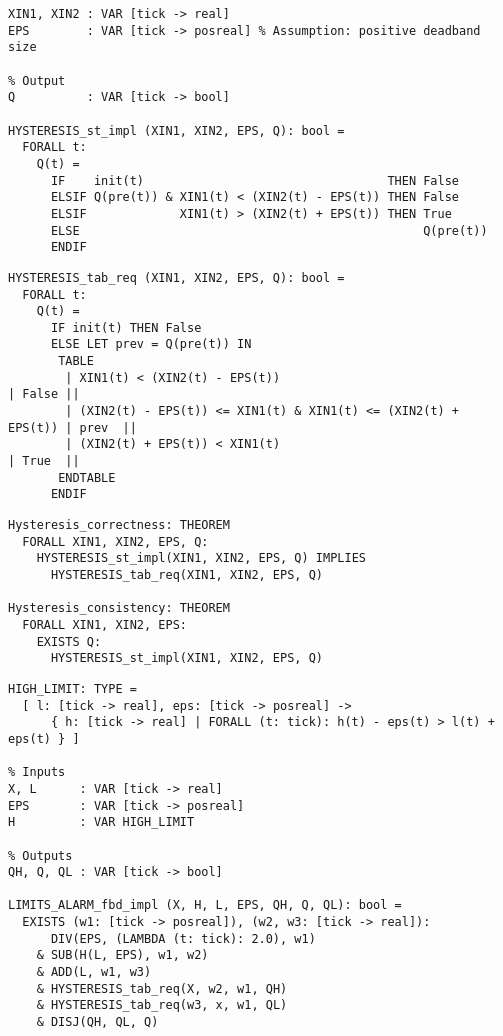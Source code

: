 \documentclass{article}
\begin{document}
\begin{lstlisting}[language=pvs,numbers=none]
% Inputs
XIN1, XIN2 : VAR [tick -> real]
EPS        : VAR [tick -> posreal] % Assumption: positive deadband size

% Output
Q          : VAR [tick -> bool]

HYSTERESIS_st_impl (XIN1, XIN2, EPS, Q): bool =
  FORALL t:
    Q(t) = 
      IF    init(t)                                  THEN False
      ELSIF Q(pre(t)) & XIN1(t) < (XIN2(t) - EPS(t)) THEN False
      ELSIF             XIN1(t) > (XIN2(t) + EPS(t)) THEN True
      ELSE                                                Q(pre(t))
      ENDIF
\end{lstlisting}

\begin{lstlisting}[language=pvs,numbers=none]
HYSTERESIS_tab_req (XIN1, XIN2, EPS, Q): bool =
  FORALL t:
    Q(t) = 
      IF init(t) THEN False
      ELSE LET prev = Q(pre(t)) IN
       TABLE
        | XIN1(t) < (XIN2(t) - EPS(t))                                  | False ||
        | (XIN2(t) - EPS(t)) <= XIN1(t) & XIN1(t) <= (XIN2(t) + EPS(t)) | prev  ||
        | (XIN2(t) + EPS(t)) < XIN1(t)                                  | True  ||
       ENDTABLE
      ENDIF
\end{lstlisting}

\begin{lstlisting}[language=pvs,numbers=none]
Hysteresis_correctness: THEOREM 
  FORALL XIN1, XIN2, EPS, Q:
    HYSTERESIS_st_impl(XIN1, XIN2, EPS, Q) IMPLIES 
      HYSTERESIS_tab_req(XIN1, XIN2, EPS, Q)

Hysteresis_consistency: THEOREM
  FORALL XIN1, XIN2, EPS:
    EXISTS Q:
      HYSTERESIS_st_impl(XIN1, XIN2, EPS, Q)
\end{lstlisting}

\clearpage

\begin{lstlisting}[language=pvs,numbers=none]
% Assumption: low and high alarm hysteresis regions do not overlap
HIGH_LIMIT: TYPE = 
  [ l: [tick -> real], eps: [tick -> posreal] -> 
      { h: [tick -> real] | FORALL (t: tick): h(t) - eps(t) > l(t) + eps(t) } ]

% Inputs
X, L      : VAR [tick -> real]
EPS       : VAR [tick -> posreal]
H         : VAR HIGH_LIMIT

% Outputs
QH, Q, QL : VAR [tick -> bool]

LIMITS_ALARM_fbd_impl (X, H, L, EPS, QH, Q, QL): bool =
  EXISTS (w1: [tick -> posreal]), (w2, w3: [tick -> real]):
      DIV(EPS, (LAMBDA (t: tick): 2.0), w1) 
    & SUB(H(L, EPS), w1, w2) 
    & ADD(L, w1, w3) 
    & HYSTERESIS_tab_req(X, w2, w1, QH) 
    & HYSTERESIS_tab_req(w3, x, w1, QL)
    & DISJ(QH, QL, Q) 
\end{lstlisting}
\end{document}
